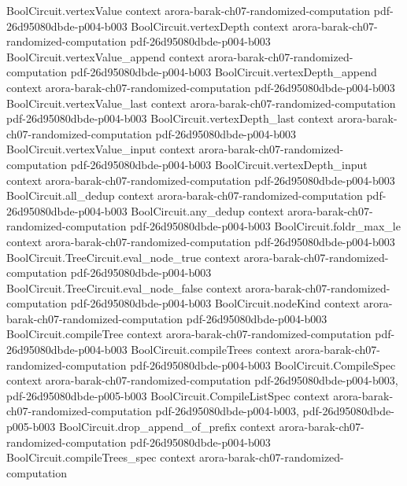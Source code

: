 \begin{theorem}
\proofstep
  {BoolCircuit.vertexValue}
  {context}
  {arora-barak-ch07-randomized-computation}
  {pdf-26d95080dbde-p004-b003}
\proofstep
  {BoolCircuit.vertexDepth}
  {context}
  {arora-barak-ch07-randomized-computation}
  {pdf-26d95080dbde-p004-b003}
\proofstep
  {BoolCircuit.vertexValue_append}
  {context}
  {arora-barak-ch07-randomized-computation}
  {pdf-26d95080dbde-p004-b003}
\proofstep
  {BoolCircuit.vertexDepth_append}
  {context}
  {arora-barak-ch07-randomized-computation}
  {pdf-26d95080dbde-p004-b003}
\proofstep
  {BoolCircuit.vertexValue_last}
  {context}
  {arora-barak-ch07-randomized-computation}
  {pdf-26d95080dbde-p004-b003}
\proofstep
  {BoolCircuit.vertexDepth_last}
  {context}
  {arora-barak-ch07-randomized-computation}
  {pdf-26d95080dbde-p004-b003}
\proofstep
  {BoolCircuit.vertexValue_input}
  {context}
  {arora-barak-ch07-randomized-computation}
  {pdf-26d95080dbde-p004-b003}
\proofstep
  {BoolCircuit.vertexDepth_input}
  {context}
  {arora-barak-ch07-randomized-computation}
  {pdf-26d95080dbde-p004-b003}
\proofstep
  {BoolCircuit.all_dedup}
  {context}
  {arora-barak-ch07-randomized-computation}
  {pdf-26d95080dbde-p004-b003}
\proofstep
  {BoolCircuit.any_dedup}
  {context}
  {arora-barak-ch07-randomized-computation}
  {pdf-26d95080dbde-p004-b003}
\proofstep
  {BoolCircuit.foldr_max_le}
  {context}
  {arora-barak-ch07-randomized-computation}
  {pdf-26d95080dbde-p004-b003}
\proofstep
  {BoolCircuit.TreeCircuit.eval_node_true}
  {context}
  {arora-barak-ch07-randomized-computation}
  {pdf-26d95080dbde-p004-b003}
\proofstep
  {BoolCircuit.TreeCircuit.eval_node_false}
  {context}
  {arora-barak-ch07-randomized-computation}
  {pdf-26d95080dbde-p004-b003}
\proofstep
  {BoolCircuit.nodeKind}
  {context}
  {arora-barak-ch07-randomized-computation}
  {pdf-26d95080dbde-p004-b003}
\proofstep
  {BoolCircuit.compileTree}
  {context}
  {arora-barak-ch07-randomized-computation}
  {pdf-26d95080dbde-p004-b003}
\proofstep
  {BoolCircuit.compileTrees}
  {context}
  {arora-barak-ch07-randomized-computation}
  {pdf-26d95080dbde-p004-b003}
\proofstep
  {BoolCircuit.CompileSpec}
  {context}
  {arora-barak-ch07-randomized-computation}
  {pdf-26d95080dbde-p004-b003,
    pdf-26d95080dbde-p005-b003}
\proofstep
  {BoolCircuit.CompileListSpec}
  {context}
  {arora-barak-ch07-randomized-computation}
  {pdf-26d95080dbde-p004-b003,
    pdf-26d95080dbde-p005-b003}
\proofstep
  {BoolCircuit.drop_append_of_prefix}
  {context}
  {arora-barak-ch07-randomized-computation}
  {pdf-26d95080dbde-p004-b003}
\proofstep
  {BoolCircuit.compileTrees_spec}
  {context}
  {arora-barak-ch07-randomized-computation}

\end{theorem}
